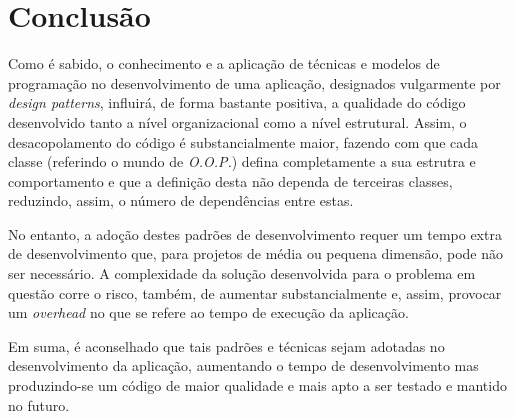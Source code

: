 \section{Conclusão}

Como é sabido, o conhecimento e a aplicação de técnicas e modelos de programação no desenvolvimento de uma aplicação, designados vulgarmente por \textit{design patterns}, influirá, de forma bastante positiva, a qualidade do código desenvolvido tanto a nível organizacional como a nível estrutural.
Assim, o desacopolamento do código é substancialmente maior, fazendo com que cada classe (referindo o mundo de \textit{O.O.P.}) defina completamente a sua estrutra e comportamento e que a definição desta não dependa de terceiras classes, reduzindo, assim, o número de dependências entre estas.

No entanto, a adoção destes padrões de desenvolvimento requer um tempo extra de desenvolvimento que, para projetos de média ou pequena dimensão, pode não ser necessário.
A complexidade da solução desenvolvida para o problema em questão corre o risco, também, de aumentar substancialmente e, assim, provocar um \textit{overhead} no que se refere ao tempo de execução da aplicação.

Em suma, é aconselhado que tais padrões e técnicas sejam adotadas no desenvolvimento da aplicação, aumentando o tempo de desenvolvimento mas produzindo-se um código de maior qualidade e mais apto a ser testado e mantido no futuro.
